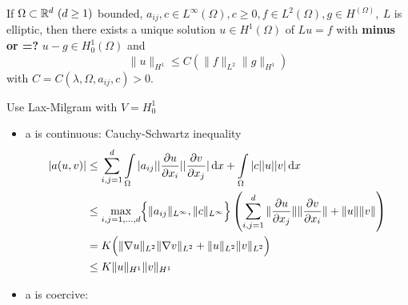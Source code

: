 \begin{enumerate}[(a)]
	\begin{thrm}
		If $\Omega \subset \mathbb{R}^d\ (d\geq1)$ bounded, $a_{ij},c \in L^\infty(\Omega), c\geq 0, f\in L^2(\Omega), g\in H^(\Omega),\ L$ is elliptic, then there exists a unique solution $u \in H^1(\Omega)$ of $Lu=f$ with \textbf{minus or =? } $u-g \in H^1_0(\Omega)$ and 
		\begin{equation*}
			\|u\|_{H^1} \leq C\left( \|f\|_{L^2} \|g\|_{H^1} \right)
		\end{equation*}  
		with $C = C(\lambda, \Omega,a_{ij},c)>0$.
	\end{thrm}

	\begin{proof_}
		Use Lax-Milgram with $V = H^1_0$
		\begin{itemize}
			\item a is continuous:\enter
			Cauchy-Schwartz inequality
			\begin{align*}
				|a(u,v)| &\leq \displaystyle \sum^d_{i,j=1} \int \limits_\Omega |a_{ij}| |\frac{\partial u}{\partial x_i}| |\frac{\partial v}{\partial x_j}| \mathop{}\!\mathrm{d} x + \int \limits_\Omega |c||u||v| \mathop{}\!\mathrm{d} x \\
				& \leq \underset{i,j = 1,\dots,d}{\text{max}} \Big\{ \|a_{ij}\|_{L^\infty}, \|c\|_{L^\infty} \Big\}\left( \displaystyle \sum^d_{i,j=1} \|\frac{\partial u}{\partial x_j}\| \|\frac{\partial v}{\partial x_i}\| + \|u\|\|v\| \right)\\
				&= K \Big( \|\nabla u\|_{L^2}\|\nabla v\|_{L^2} + \|u\|_{L^2}\|v\|_{L^2} \Big)\\
				&\leq K \|u\|_{H^1}\|v\|_{H^1}
			\end{align*}
			\item a is coercive: \enter
			
		\end{itemize}
	\end{proof_}
\end{enumerate}






